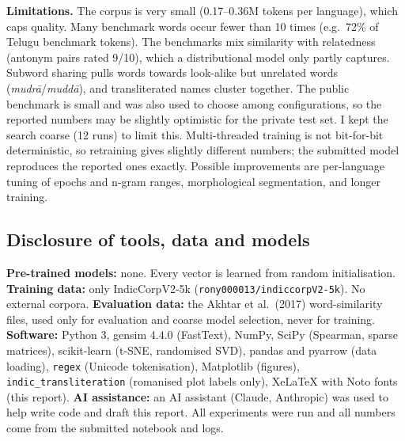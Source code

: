 \documentclass[11pt,a4paper]{article}
\begin{document}
\textbf{Limitations.} The corpus is very small (0.17--0.36M tokens per language), which caps quality. Many benchmark words occur fewer than 10 times (e.g.\ 72\% of Telugu benchmark tokens). The benchmarks mix similarity with relatedness (antonym pairs rated 9/10), which a distributional model only partly captures. Subword sharing pulls words towards look-alike but unrelated words (\textit{mudrā}/\textit{muddā}), and transliterated names cluster together. The public benchmark is small and was also used to choose among configurations, so the reported numbers may be slightly optimistic for the private test set. I kept the search coarse (12 runs) to limit this. Multi-threaded training is not bit-for-bit deterministic, so retraining gives slightly different numbers; the submitted model reproduces the reported ones exactly. Possible improvements are per-language tuning of epochs and n-gram ranges, morphological segmentation, and longer training.

\subsection*{Disclosure of tools, data and models}
\textbf{Pre-trained models:} none. Every vector is learned from random initialisation. \textbf{Training data:} only IndicCorpV2-5k (\texttt{rony000013/indiccorpV2-5k}). No external corpora. \textbf{Evaluation data:} the Akhtar et al.\ (2017) word-similarity files, used only for evaluation and coarse model selection, never for training. \textbf{Software:} Python 3, gensim 4.4.0 (FastText), NumPy, SciPy (Spearman, sparse matrices), scikit-learn (t-SNE, randomised SVD), pandas and pyarrow (data loading), \texttt{regex} (Unicode tokenisation), Matplotlib (figures), \texttt{indic\_transliteration} (romanised plot labels only), XeLaTeX with Noto fonts (this report). \textbf{AI assistance:} an AI assistant (Claude, Anthropic) was used to help write code and draft this report. All experiments were run and all numbers come from the submitted notebook and logs.
\end{document}
